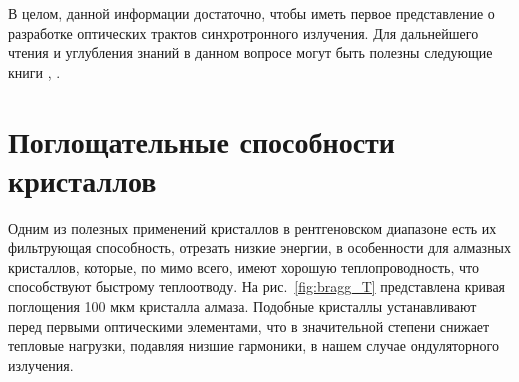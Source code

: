 В целом, данной информации достаточно, чтобы иметь первое представление о разработке оптических трактов синхротронного излучения. Для дальнейшего чтения и углубления знаний в данном вопросе могут быть полезны следующие книги \cite{als2011elements}, \cite{authier2006dynamical}.

\section{Поглощательные способности кристаллов}
Одним из полезных применений кристаллов в рентгеновском диапазоне есть их фильтрующая способность, отрезать низкие энергии, в особенности для алмазных кристаллов, которые, по мимо всего, имеют хорошую теплопроводность, что способствуют быстрому теплоотводу. На рис.~\ref{fig:bragg_T} представлена кривая поглощения 100 мкм кристалла алмаза. Подобные кристаллы устанавливают перед первыми оптическими элементами, что в значительной степени снижает тепловые нагрузки, подавляя низшие гармоники, в нашем случае ондуляторного излучения. 

